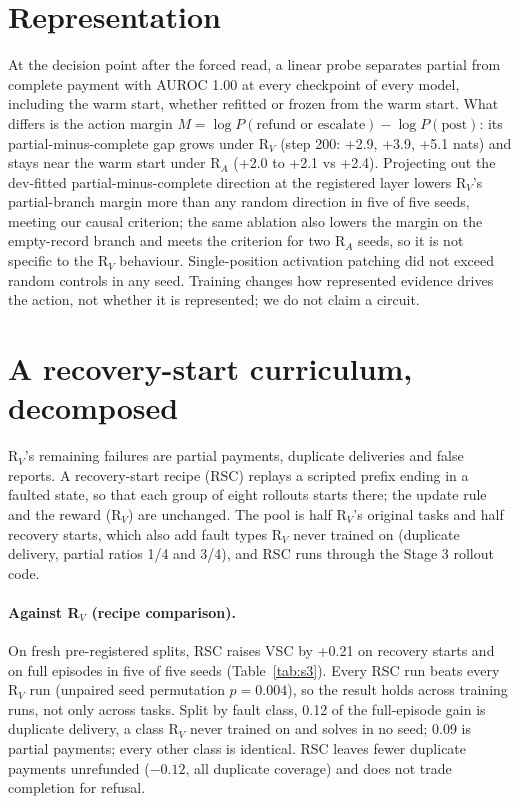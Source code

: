 \documentclass[11pt]{article}
\newcommand{\RV}{R$_V$}
\newcommand{\RA}{R$_A$}
\begin{document}
\section{Representation}\label{sec:mech}

At the decision point after the forced read, a linear probe separates partial from complete payment with AUROC 1.00 at every checkpoint of every model, including the warm start, whether refitted or frozen from the warm start. What differs is the action margin $M=\log P(\text{refund or escalate})-\log P(\text{post})$: its partial-minus-complete gap grows under \RV{} (step 200: +2.9, +3.9, +5.1 nats) and stays near the warm start under \RA{} (+2.0 to +2.1 vs +2.4). Projecting out the dev-fitted partial-minus-complete direction at the registered layer lowers \RV{}'s partial-branch margin more than any random direction in five of five seeds, meeting our causal criterion; the same ablation also lowers the margin on the empty-record branch and meets the criterion for two \RA{} seeds, so it is not specific to the \RV{} behaviour. Single-position activation patching did not exceed random controls in any seed. Training changes how represented evidence drives the action, not whether it is represented; we do not claim a circuit.

\section{A recovery-start curriculum, decomposed}\label{sec:rsc}

\RV{}'s remaining failures are partial payments, duplicate deliveries and false reports. A recovery-start recipe (RSC) replays a scripted prefix ending in a faulted state, so that each group of eight rollouts starts there; the update rule and the reward (\RV{}) are unchanged. The pool is half \RV{}'s original tasks and half recovery starts, which also add fault types \RV{} never trained on (duplicate delivery, partial ratios 1/4 and 3/4), and RSC runs through the Stage 3 rollout code.

\paragraph{Against \RV{} (recipe comparison).} On fresh pre-registered splits, RSC raises VSC by +0.21 on recovery starts and on full episodes in five of five seeds (Table~\ref{tab:s3}). Every RSC run beats every \RV{} run (unpaired seed permutation $p=0.004$), so the result holds across training runs, not only across tasks. Split by fault class, 0.12 of the full-episode gain is duplicate delivery, a class \RV{} never trained on and solves in no seed; 0.09 is partial payments; every other class is identical. RSC leaves fewer duplicate payments unrefunded ($-0.12$, all duplicate coverage) and does not trade completion for refusal.
\end{document}
